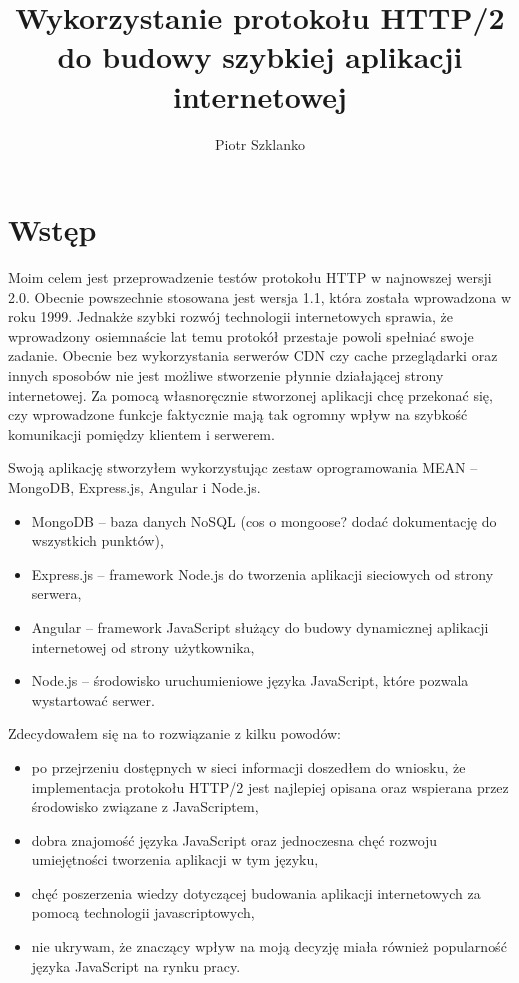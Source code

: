 \documentclass[a4paper,12pt,twoside,openany]{report}
\title{Wykorzystanie protokołu HTTP/2 do budowy szybkiej aplikacji internetowej}
\author{Piotr Szklanko}
\begin{document}
\maketitle

\chapter{Wstęp}
Moim celem jest przeprowadzenie testów protokołu HTTP w najnowszej wersji 2.0.
Obecnie powszechnie stosowana jest wersja 1.1, która została wprowadzona w roku 1999.
Jednakże szybki rozwój technologii internetowych sprawia, że wprowadzony osiemnaście lat temu protokół przestaje powoli spełniać swoje zadanie.
Obecnie bez wykorzystania serwerów CDN czy cache przeglądarki oraz innych sposobów nie jest możliwe stworzenie płynnie działającej strony internetowej.
Za pomocą własnoręcznie stworzonej aplikacji chcę przekonać się, czy wprowadzone funkcje faktycznie mają tak ogromny wpływ na szybkość komunikacji pomiędzy klientem i serwerem.

Swoją aplikację stworzyłem wykorzystując zestaw oprogramowania MEAN -- MongoDB, Express.js, Angular i Node.js.
\begin{itemize}
	\item MongoDB -- baza danych NoSQL (cos o mongoose? dodać dokumentację do wszystkich punktów),
	\item Express.js -- framework Node.js do tworzenia aplikacji sieciowych od strony serwera,
	\item Angular -- framework JavaScript służący do budowy dynamicznej aplikacji internetowej od strony użytkownika,
	\item Node.js -- środowisko uruchumieniowe języka JavaScript, które pozwala wystartować serwer.
\end{itemize}
Zdecydowałem się na to rozwiązanie z kilku powodów:
\begin{itemize}
	\item po przejrzeniu dostępnych w sieci informacji doszedłem do wniosku, że implementacja protokołu HTTP/2 jest najlepiej opisana oraz wspierana przez środowisko związane z JavaScriptem,
	\item dobra znajomość języka JavaScript oraz jednoczesna chęć rozwoju umiejętności tworzenia aplikacji w tym języku,
	\item chęć poszerzenia wiedzy dotyczącej budowania aplikacji internetowych za pomocą technologii javascriptowych,
	\item nie ukrywam, że znaczący wpływ na moją decyzję miała również popularność języka JavaScript na rynku pracy.
\end{itemize}
\end{document}
